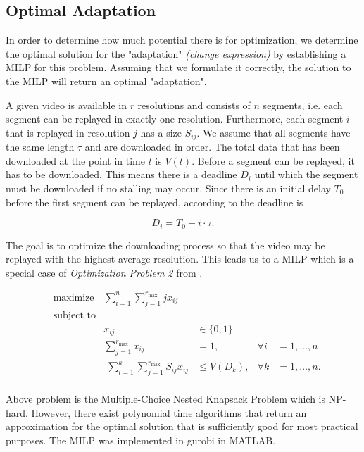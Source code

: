\subsection{Optimal Adaptation}

In order to determine how much potential there is for optimization, we determine the optimal solution for the "adaptation" \textit{(change expression)} by establishing a MILP for this problem. Assuming that we formulate it correctly, the solution to the MILP will return an optimal "adaptation".

A given video is available in $r$ resolutions and consists of $n$ segments, i.e. each segment can be replayed in exactly one resolution. Furthermore, each segment $i$ that is replayed in resolution $j$ has a size $S_{ij}$. We assume that all segments have the same length $\tau$ and are downloaded in order. The total data that has been downloaded at the point in time $t$ is $V(t)$. Before a segment can be replayed, it has to be downloaded. This means there is a deadline $D_i$ until which the segment must be downloaded if no stalling may occur. Since there is an initial delay $T_0$ before the first segment can be replayed, according to \cite{hossfeld2015identifying} the deadline is

\begin{equation}
D_i = T_0 + i\cdot \tau.
\end{equation}

The goal is to optimize the downloading process so that the video may be replayed with the highest average resolution. This leads us to a MILP which is a special case of \textit{Optimization Problem 2} from \cite{hossfeld2015identifying}.

\begin{align*}
& \text{maximize} & \sum_{i = 1}^{n} \sum_{j = 1}^{r_{\text{max}}} j x_{ij} &\\
& \text{subject to} & &&\\
&& x_{ij} &\in \{0,1\} &\\
&& \sum_{j = 1}^{r_{\text{max}}} x_{ij} &= 1, &\forall i&=1,\ldots,n \\
&& \phantom{\text{.}} \sum_{i=1}^{k} \sum_{j = 1}^{r_{\text{max}}} S_{ij} x_{ij} &\leq V(D_k), &\forall k&=1,\ldots,n \text{.} \\
\end{align*}

Above problem is the Multiple-Choice Nested Knapsack Problem which is NP-hard. However, there exist polynomial time algorithms that return an approximation for the optimal solution that is sufficiently good for most practical purposes. The MILP was implemented in gurobi in MATLAB.
